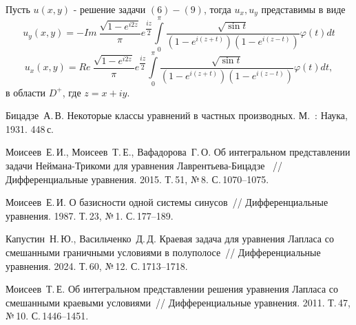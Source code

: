 \begin{vkrthesis}
\begin{theorem}
	\label{th:fivebf}
		Пусть $u(x,y)$ - решение задачи $(6)-(9)$, тогда $u_x, u_y$ представимы в виде
	\begin{equation}
		u_y(x,y) = - Im\  \dfrac{ \sqrt{1 - e^{i2z}} }{\pi} e^{\dfrac{iz}{2}} \int\limits_0^\pi  \dfrac{\sqrt{\sin{t}}}{\left(1 - e^{i(z+t)} \right) \left(1 - e^{i(z-t)}\right)}  \varphi(t) dt
	\end{equation}
	\begin{equation}
		u_x(x,y) = Re\   \dfrac{ \sqrt{1 - e^{i2z}} }{\pi} e^{\dfrac{iz}{2}} \int\limits_0^\pi  \dfrac{\sqrt{\sin{t}}}{\left(1 - e^{i(z+t)} \right) \left(1 - e^{i(z-t)}\right)}  \varphi(t) dt,
	\end{equation} 
	в области $D^+$, где $z = x + iy$.
\end{theorem}


\begin{vkrreferences}
	
\item
Бицадзе~А.\,В. Некоторые классы уравнений в частных производных. М.~: Наука, 1931. 448\,с.	
	
\item
Моисеев~Е.\,И., Моисеев~Т.\,Е., Вафадорова~Г.\,О. Об интегральном представлении задачи Неймана-Трикоми для уравнения Лаврентьева-Бицадзе ~// Дифференциальные уравнения. 2015. Т.\,51, №\,8. С.\,1070--1075.	
	
\item
Моисеев~Е.\,И. О базисности одной системы синусов~// Дифференциальные уравнения. 1987. Т.\,23, №\,1. С.\,177--189.	
	
\item
Капустин~Н.\,Ю., Васильченко~Д.\,Д. Краевая задача для уравнения Лапласа со смешанными граничными условиями в полуполосе~// Дифференциальные уравнения. 2024. Т.\,60, №\,12. С.\,1713--1718.	

\item
Моисеев~Т.\,Е. Об интегральном представлении решения уравнения Лапласа со смешанными краевыми условиями~// Дифференциальные уравнения. 2011. Т.\,47, №\,10. С.\,1446--1451.	


\end{vkrreferences}
\end{vkrthesis}
